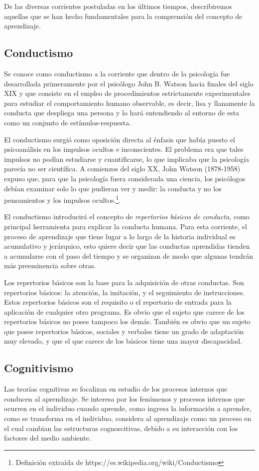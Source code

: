 De las diversas corrientes postuladas en los últimos tiempos, describiremos
aquellas que se han hecho fundamentales para la comprensión del concepto de 
aprendizaje.

\subsection{Conductismo}
Se conoce como conductismo a la corriente que dentro de la psicología fue
desarrollada primeramente por el psicólogo John B. Watson hacia finales del
siglo XIX y que consiste en el empleo de procedimientos estrictamente
experimentales para estudiar el comportamiento humano observable, es decir,
lisa y llanamente la conducta que despliega una persona y lo hará entendiendo
al entorno de esta como un conjunto de estímulos-respuesta.\cite{ABC}

El conductismo surgió como oposición directa al énfasis que había puesto el
psicoanálisis en los impulsos ocultos e inconscientes. El problema era que
tales impulsos no podían estudiarse y cuantificarse, lo que implicaba que la
psicología parecía no ser científica. A comienzos del siglo XX, John Watson
(1878-1958) expuso que, para que la psicología fuera considerada una ciencia,
los psicólogos debían examinar solo lo que pudieran ver y medir: la conducta y
no los pensamientos y los impulsos ocultos.\footnote{Definición extraída de
https://es.wikipedia.org/wiki/Conductismo}.

El conductismo introducirá el concepto de \emph{repertorios básicos de
conducta}, como principal herramienta para explicar la conducta humana. Para
esta corriente, el proceso de aprendizaje que tiene lugar a lo largo de la
historia individual es acumulativo y jerárquico, esto quiere decir que las
conductas aprendidas tienden a acumularse con el paso del tiempo y se organizan
de modo que algunas tendrán más preeminencia sobre otras.

Los repertorios básicos son la base para la adquisición de otras conductas. Son
repertorios básicos: la atención, la imitación, y el seguimiento de 
instrucciones. Estos repertorios básicos son el requisito o el repertorio de
entrada para la aplicación de cualquier otro programa. Es obvio que el sujeto
que carece de los repertorios básicos no posee tampoco los demás. También es
obvio que un sujeto que posee repertorios básicos, sociales y verbales tiene un
grado de adaptación muy elevado, y que el que carece de los básicos tiene una
mayor discapacidad.\cite{Glez}

\subsection{Cognitivismo}
Las teorías cognitivas se focalizan en estudio de los procesos internos que
conducen al aprendizaje. Se interesa por los fenómenos y procesos internos que
ocurren en el individuo cuando aprende, como ingresa la información a aprender,
como se transforma en el individuo, considera al aprendizaje como un proceso en
el cual cambian las estructuras cognoscitivas, debido a su interacción con los
factores del medio ambiente.

